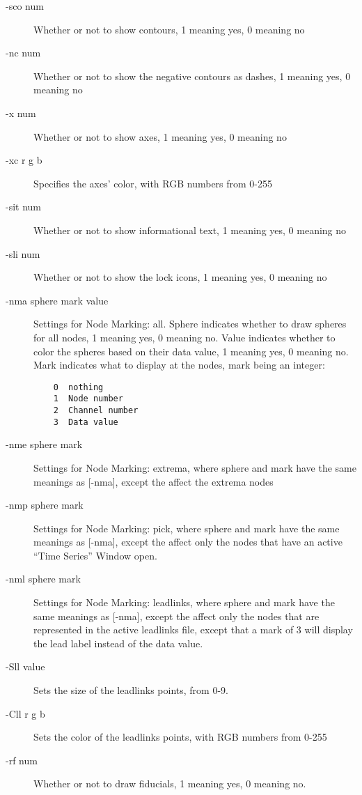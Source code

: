\begin{description}
  \item[{-sco num}] Whether or not to show contours, 1 meaning yes, 0 meaning no
  \item[{-nc num}] Whether or not to show the negative contours as dashes, 1 meaning yes, 0 meaning no
  \item[{-x num}] Whether or not to show axes, 1 meaning yes, 0 meaning no
  \item[{-xc r g b}] Specifies the axes' color, with RGB numbers from 0-255
  \item[{-sit num}] Whether or not to show informational text, 1 meaning yes, 0 meaning no
  \item[{-sli num}] Whether or not to show the lock icons, 1 meaning yes, 0 meaning no
  \item[{-nma sphere mark value}] Settings for Node Marking: all.  
    Sphere indicates whether to draw spheres for all nodes, 1 meaning yes, 0 meaning no.
    Value indicates whether to color the spheres based on their data value, 1 meaning yes, 0 meaning no.
    Mark indicates what to display at the nodes, mark being an integer:
    \begin{verbatim}
    0  nothing
    1  Node number
    2  Channel number
    3  Data value
    \end{verbatim}
  \item[{-nme sphere mark}] Settings for Node Marking: extrema, where sphere and mark 
  have the same meanings as [{-nma}], except the affect the extrema nodes
  \item[{-nmp sphere mark}] Settings for Node Marking: pick, where sphere and mark 
  have the same meanings as [{-nma}], except the affect only the nodes that have an active ``Time Series''
  Window open.
  \item[{-nml sphere mark}] Settings for Node Marking: leadlinks, where sphere and mark 
  have the same meanings as [{-nma}], except the affect only the nodes that are
  represented in the active leadlinks file, except that a mark of 3 will display the lead label
  instead of the data value.
  \item[{-Sll value}] Sets the size of the leadlinks points, from 0-9.
  \item[{-Cll r g b}] Sets the color of the leadlinks points, with RGB numbers from 0-255
  \item[{-rf num}] Whether or not to draw fiducials, 1 meaning yes, 0 meaning no.  
  
  
\end{description}

